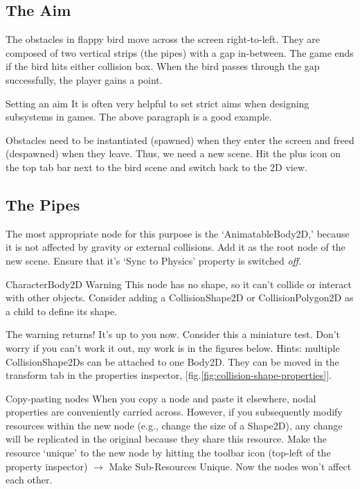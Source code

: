 \documentclass[14pt]{extarticle}
\newcommand{\prettyref}[2]{[{#1}.\ref{#2}]}
\begin{document}
\subsection*{The Aim}
The obstacles in flappy bird move across the screen right-to-left. They are composed of two vertical strips (the pipes) with a gap in-between. The game ends if the bird hits either collision box. When the bird passes through the gap successfully, the player gains a point.

\begin{callout-note}{Setting an aim}
It is often very helpful to set strict aims when designing subsystems in games. The above paragraph is a good example.
\end{callout-note}

Obstacles need to be instantiated (spawned) when they enter the screen and freed (despawned) when they leave. Thus, we need a new scene. Hit the plus icon on the top tab bar next to the bird scene and switch back to the 2D view.

\subsection*{The Pipes}
The most appropriate node for this purpose is the `AnimatableBody2D,' because it is not affected by gravity or external collisions. Add it as the root node of the new scene. Ensure that it's `Sync to Physics' property is switched \emph{off}.

\begin{callout-warning}{CharacterBody2D Warning}
This node has no shape, so it can't collide or interact with other objects. Consider adding a CollisionShape2D or CollisionPolygon2D as a child to define its shape.
\end{callout-warning}

The warning returns! It's up to you now. Consider this a miniature test. Don't worry if you can't work it out, my work is in the figures below. Hints: multiple CollisionShape2Ds can be attached to one Body2D. They can be moved in the transform tab in the properties inspector, \prettyref{fig}{fig:collision-shape-properties}.

\clearpage

\begin{callout-note}{Copy-pasting nodes}
When you copy a node and paste it elsewhere, nodal properties are conveniently carried across. However, if you subsequently modify resources within the new node (e.g., change the size of a Shape2D), any change will be replicated in the original because they share this resource. Make the resource `unique' to the new node by hitting the toolbar icon (top-left of the property inspector) $\rightarrow$ Make Sub-Resources Unique. Now the nodes won't affect each other.
\end{callout-note}
\end{document}
